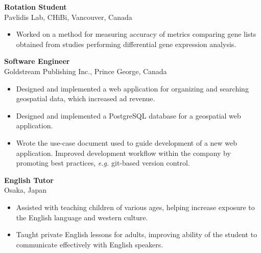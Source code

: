 \documentclass[11pt, a4paper]{article}
\newcommand{\years}[1]{\marginnote{\footnotesize #1}}
\begin{document}
\years{2011}\textbf{Rotation Student}\\
Pavlidis Lab, CHiBi, Vancouver, Canada
\begin{itemize}
    \item Worked on a method for measuring accuracy of metrics comparing gene lists obtained from studies performing differential gene expression analysis.\\
\end{itemize}

\years{2009--2011}\textbf{Software Engineer}\\
Goldstream Publishing Inc., Prince George, Canada
\begin{itemize}
    \item Designed and implemented a web application for organizing and searching geospatial data, which increased ad revenue.
    \item Designed and implemented a PostgreSQL database for a geospatial web application.
    \item Wrote the use-case document used to guide development of a new web application. Improved development workflow within the company by promoting best practices, \textit{e.g.} git-based version control.\\
\end{itemize}


\years{2007--2008}\textbf{English Tutor}\\
Osaka, Japan
\begin{itemize}
    \item Assisted with teaching children of various ages, helping increase exposure to the English language and western culture.
    \item Taught private English lessons for adults, improving ability of the student to communicate effectively with English speakers.\\
\end{itemize}
\end{document}
